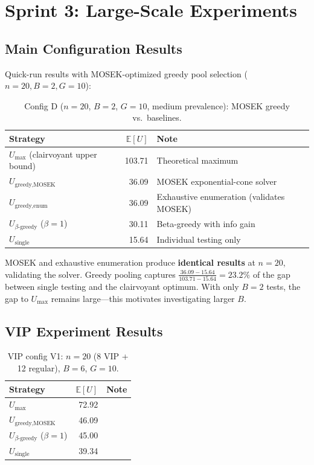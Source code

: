 \documentclass[11pt,a4paper]{article}
\newcommand{\E}{\mathbb{E}}
\begin{document}
\section{Sprint 3: Large-Scale Experiments}
\label{sec:sprint3}

\subsection{Main Configuration Results}

Quick-run results with MOSEK-optimized greedy pool selection ($n=20, B=2, G=10$):

\begin{table}[h]
\centering
\caption{Config D ($n=20$, $B=2$, $G=10$, medium prevalence): MOSEK greedy vs.\ baselines.}
\label{tab:sprint3_main}
\begin{tabular}{lrl}
\toprule
\textbf{Strategy} & $\E[U]$ & \textbf{Note} \\
\midrule
$U_{\max}$ (clairvoyant upper bound) & 103.71 & Theoretical maximum \\
$U_{\text{greedy,MOSEK}}$ & 36.09 & MOSEK exponential-cone solver \\
$U_{\text{greedy,enum}}$ & 36.09 & Exhaustive enumeration (validates MOSEK) \\
$U_{\beta\text{-greedy}}$ ($\beta=1$) & 30.11 & Beta-greedy with info gain \\
$U_{\text{single}}$ & 15.64 & Individual testing only \\
\bottomrule
\end{tabular}
\end{table}

\begin{finding}
MOSEK and exhaustive enumeration produce \textbf{identical results} at $n=20$, validating the solver.
Greedy pooling captures $\frac{36.09 - 15.64}{103.71 - 15.64} = 23.2\%$ of the gap between single testing and the clairvoyant optimum.
With only $B=2$ tests, the gap to $U_{\max}$ remains large---this motivates investigating larger $B$.
\end{finding}


\subsection{VIP Experiment Results}

\begin{table}[h]
\centering
\caption{VIP config V1: $n=20$ (8 VIP + 12 regular), $B=6$, $G=10$.}
\label{tab:sprint3_vip}
\begin{tabular}{lrl}
\toprule
\textbf{Strategy} & $\E[U]$ & \textbf{Note} \\
\midrule
$U_{\max}$ & 72.92 & \\
$U_{\text{greedy,MOSEK}}$ & 46.09 & \\
$U_{\beta\text{-greedy}}$ ($\beta=1$) & 45.00 & \\
$U_{\text{single}}$ & 39.34 & \\
\bottomrule
\end{tabular}
\end{table}
\end{document}

